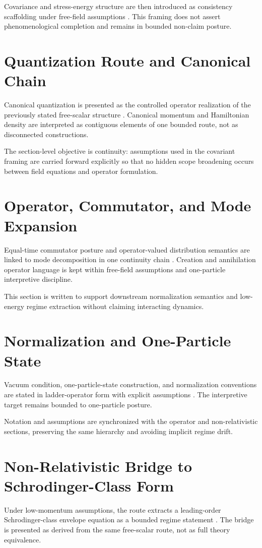 \documentclass[11pt]{article}
\begin{document}
Covariance and stress-energy structure are then introduced as consistency scaffolding under free-field assumptions \cite{toescalarcovariance}. This framing does not assert phenomenological completion and remains in bounded non-claim posture.

\section{Quantization Route and Canonical Chain}
Canonical quantization is presented as the controlled operator realization of the previously stated free-scalar structure \cite{toescalarquantization}. Canonical momentum and Hamiltonian density are interpreted as contiguous elements of one bounded route, not as disconnected constructions.

The section-level objective is continuity: assumptions used in the covariant framing are carried forward explicitly so that no hidden scope broadening occurs between field equations and operator formulation.

\section{Operator, Commutator, and Mode Expansion}
Equal-time commutator posture and operator-valued distribution semantics are linked to mode decomposition in one continuity chain \cite{toescalarmodeexpansion}. Creation and annihilation operator language is kept within free-field assumptions and one-particle interpretive discipline.

This section is written to support downstream normalization semantics and low-energy regime extraction without claiming interacting dynamics.

\section{Normalization and One-Particle State}
Vacuum condition, one-particle-state construction, and normalization conventions are stated in ladder-operator form with explicit assumptions \cite{toescalarnormalization}. The interpretive target remains bounded to one-particle posture.

Notation and assumptions are synchronized with the operator and non-relativistic sections, preserving the same hierarchy and avoiding implicit regime drift.

\section{Non-Relativistic Bridge to Schrodinger-Class Form}
Under low-momentum assumptions, the route extracts a leading-order Schrodinger-class envelope equation as a bounded regime statement \cite{toescalarnonrelativistic}. The bridge is presented as derived from the same free-scalar route, not as full theory equivalence.
\end{document}
